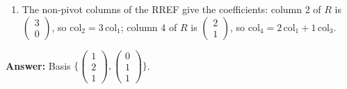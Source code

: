 \documentclass[11pt]{article}
\begin{document}
\begin{tcolorbox}[breakable,colback=white,colframe=ink!60,title={\bfseries Example 6 \textperiodcentered\ Column space basis and column relations}]
\begin{enumerate}[leftmargin=1.6em,itemsep=1pt,topsep=2pt,label=\arabic*.]
\item The non-pivot columns of the RREF give the coefficients: column 2 of $R$ is $\begin{pmatrix}3\\0\end{pmatrix}$, so $\text{col}_2=3\,\text{col}_1$; column 4 of $R$ is $\begin{pmatrix}2\\1\end{pmatrix}$, so $\text{col}_4=2\,\text{col}_1+1\,\text{col}_3$.
\end{enumerate}\textbf{Answer:} Basis $\{\begin{pmatrix}1\\2\\1\end{pmatrix},\begin{pmatrix}0\\1\\1\end{pmatrix}\}$.
\end{tcolorbox}
\end{document}

